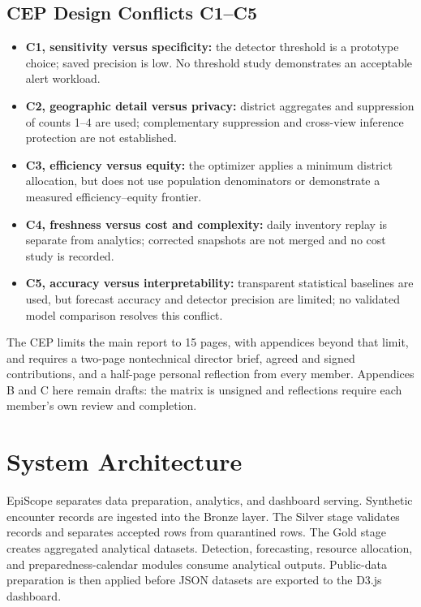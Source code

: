 ﻿\documentclass[conference]{IEEEtran}
\begin{document}
\subsection{CEP Design Conflicts C1--C5}
\begin{itemize}
\item \textbf{C1, sensitivity versus specificity:} the detector threshold is a prototype choice; saved precision is low. No threshold study demonstrates an acceptable alert workload.
\item \textbf{C2, geographic detail versus privacy:} district aggregates and suppression of counts 1--4 are used; complementary suppression and cross-view inference protection are not established.
\item \textbf{C3, efficiency versus equity:} the optimizer applies a minimum district allocation, but does not use population denominators or demonstrate a measured efficiency--equity frontier.
\item \textbf{C4, freshness versus cost and complexity:} daily inventory replay is separate from analytics; corrected snapshots are not merged and no cost study is recorded.
\item \textbf{C5, accuracy versus interpretability:} transparent statistical baselines are used, but forecast accuracy and detector precision are limited; no validated model comparison resolves this conflict.
\end{itemize}
The CEP limits the main report to 15 pages, with appendices beyond that limit, and requires a two-page nontechnical director brief, agreed and signed contributions, and a half-page personal reflection from every member. Appendices B and C here remain drafts: the matrix is unsigned and reflections require each member's own review and completion.

\section{System Architecture}

EpiScope separates data preparation, analytics, and dashboard serving. Synthetic encounter records are ingested into the Bronze layer. The Silver stage validates records and separates accepted rows from quarantined rows. The Gold stage creates aggregated analytical datasets. Detection, forecasting, resource allocation, and preparedness-calendar modules consume analytical outputs. Public-data preparation is then applied before JSON datasets are exported to the D3.js dashboard.
\end{document}

